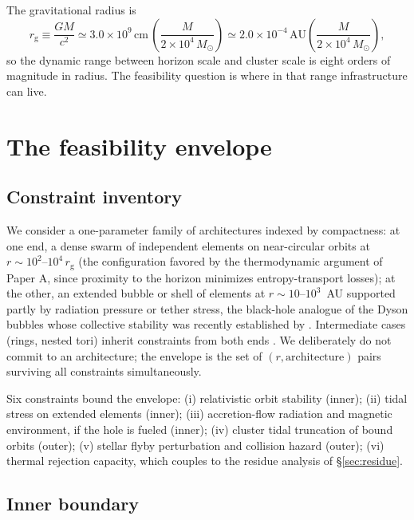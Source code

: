 \documentclass[11pt]{article}
\newcommand{\msun}{\ensuremath{M_\odot}}
\newcommand{\rg}{\ensuremath{r_{\mathrm{g}}}}
\begin{document}
The gravitational radius is
\begin{equation}
\rg \equiv \frac{GM}{c^{2}} \simeq 3.0\times10^{9}\,\mathrm{cm}\,
\left(\frac{M}{2\times10^{4}\,\msun}\right)
\simeq 2.0\times10^{-4}\,\mathrm{AU}\left(\frac{M}{2\times10^{4}\,\msun}\right),
\end{equation}
so the dynamic range between horizon scale and cluster scale is eight orders of magnitude in radius. The feasibility question is where in that range infrastructure can live.

\section{The feasibility envelope}
\label{sec:envelope}

\subsection{Constraint inventory}
\label{sec:inventory}

We consider a one-parameter family of architectures indexed by compactness: at one end, a dense swarm of independent elements on near-circular orbits at $r \sim 10^{2}$--$10^{4}\,\rg$ (the configuration favored by the thermodynamic argument of Paper A, since proximity to the horizon minimizes entropy-transport losses); at the other, an extended bubble or shell of elements at $r \sim 10$--$10^{3}$~AU supported partly by radiation pressure or tether stress, the black-hole analogue of the Dyson bubbles whose collective stability was recently established by \citet{McInnes2026}. Intermediate cases (rings, nested tori) inherit constraints from both ends \citep{Raval2024}. We deliberately do not commit to an architecture; the envelope is the set of $(r, \text{architecture})$ pairs surviving all constraints simultaneously.

Six constraints bound the envelope:
(i) relativistic orbit stability (inner);
(ii) tidal stress on extended elements (inner);
(iii) accretion-flow radiation and magnetic environment, if the hole is fueled (inner);
(iv) cluster tidal truncation of bound orbits (outer);
(v) stellar flyby perturbation and collision hazard (outer);
(vi) thermal rejection capacity, which couples to the residue analysis of \S\ref{sec:residue}.

\subsection{Inner boundary}
\label{sec:inner}
\end{document}
